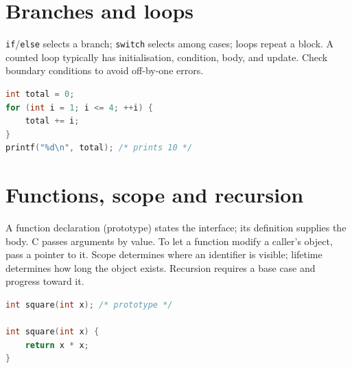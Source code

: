 \documentclass[11pt,a4paper]{article}
\begin{document}
\section{Branches and loops}
\texttt{if}/\texttt{else} selects a branch; \texttt{switch} selects among cases; loops repeat a block. A counted loop typically has initialisation, condition, body, and update. Check boundary conditions to avoid off-by-one errors.
\begin{lstlisting}[language=C]
int total = 0;
for (int i = 1; i <= 4; ++i) {
    total += i;
}
printf("%d\n", total); /* prints 10 */
\end{lstlisting}
\begin{center}\end{center}
\section{Functions, scope and recursion}
A function declaration (prototype) states the interface; its definition supplies the body. C passes arguments by value. To let a function modify a caller's object, pass a pointer to it. Scope determines where an identifier is visible; lifetime determines how long the object exists. Recursion requires a base case and progress toward it.
\begin{lstlisting}[language=C]
int square(int x); /* prototype */

int square(int x) {
    return x * x;
}
\end{lstlisting}
\end{document}
